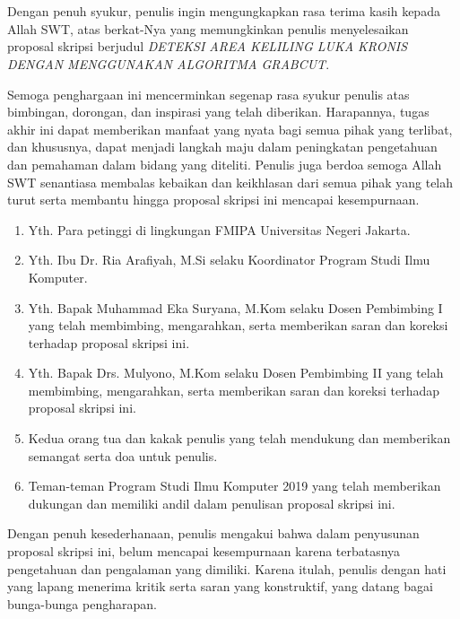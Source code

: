 \chapter*{}
\onehalfspacing{}
Dengan penuh syukur, penulis ingin mengungkapkan rasa terima kasih kepada Allah SWT, 
atas berkat-Nya yang memungkinkan penulis menyelesaikan proposal skripsi berjudul 
\textit{DETEKSI AREA KELILING LUKA KRONIS DENGAN MENGGUNAKAN ALGORITMA GRABCUT}.

Semoga penghargaan ini mencerminkan segenap rasa syukur penulis atas bimbingan, 
dorongan, dan inspirasi yang telah diberikan. Harapannya, tugas akhir ini dapat 
memberikan manfaat yang nyata bagi semua pihak yang terlibat, dan khususnya, dapat 
menjadi langkah maju dalam peningkatan pengetahuan dan pemahaman dalam bidang yang 
diteliti. Penulis juga berdoa semoga Allah SWT senantiasa membalas kebaikan dan 
keikhlasan dari semua pihak yang telah turut serta membantu hingga proposal skripsi 
ini mencapai kesempurnaan.

\begin{enumerate}

	\item{Yth. Para petinggi di lingkungan FMIPA Universitas Negeri Jakarta.}
	\item{Yth. Ibu Dr. Ria Arafiyah, M.Si selaku Koordinator Program Studi Ilmu
		Komputer.}
	\item{Yth. Bapak Muhammad Eka Suryana, M.Kom selaku Dosen Pembimbing I yang
		telah membimbing, mengarahkan, serta memberikan saran dan koreksi terhadap
		proposal skripsi ini.}
	\item{Yth. Bapak Drs. Mulyono, M.Kom selaku Dosen Pembimbing II yang telah
		membimbing, mengarahkan, serta memberikan saran dan koreksi terhadap
		proposal skripsi ini.}
	\item{Kedua orang tua dan kakak penulis yang telah mendukung dan memberikan 
		semangat serta doa untuk penulis.}
	\item{Teman-teman Program Studi Ilmu Komputer 2019 yang telah memberikan 
		dukungan dan memiliki andil dalam penulisan proposal skripsi ini.}
	
\end{enumerate}

Dengan penuh kesederhanaan, penulis mengakui bahwa dalam penyusunan proposal skripsi 
ini, belum mencapai kesempurnaan karena terbatasnya pengetahuan dan pengalaman 
yang dimiliki. Karena itulah, penulis dengan hati yang lapang menerima kritik 
serta saran yang konstruktif, yang datang bagai bunga-bunga pengharapan.

